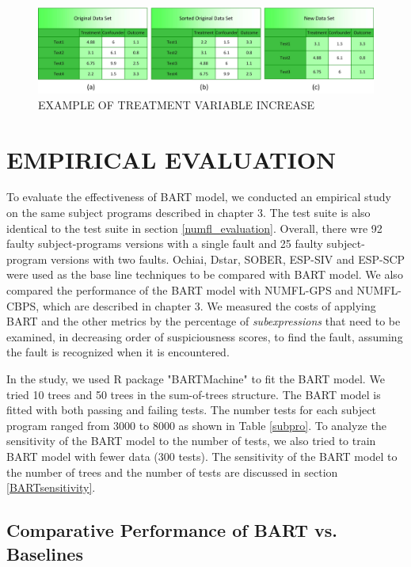 \begin{figure}[!thpb]
\centering
\includegraphics[width=1\textwidth]{chapter4_BART_ACE.pdf}
\caption{EXAMPLE OF TREATMENT VARIABLE INCREASE}
\label{bartace}
\end{figure}

\section{EMPIRICAL EVALUATION}\label{BARTevaluation}%

To evaluate the effectiveness of BART model, we conducted an empirical study on the same subject programs described in chapter 3.  The test suite is also identical to the test suite in section \ref{numfl_evaluation}.  Overall, there wre 92 faulty subject-programs versions with a single fault and 25 faulty subject-program versions with two faults. Ochiai, Dstar, SOBER, ESP-SIV and ESP-SCP were used as the base line techniques to be compared with BART model. We also compared the performance of the BART model with NUMFL-GPS and NUMFL-CBPS, which are described in chapter 3. We measured the costs of applying BART and the other metrics by the percentage of {\it subexpressions} that need to be examined, in decreasing order of suspiciousness scores, to find the fault, assuming the fault is recognized when it is encountered.

In the study, we used R package "BARTMachine" \cite{BARTMachine} to fit the BART model. We tried 10 trees and 50 trees in the sum-of-trees structure.  The BART model is fitted with both passing and failing tests. The number tests for each subject program ranged from 3000 to 8000 as shown in Table \ref{subpro}. To analyze the sensitivity of the BART model to the number of  tests, we also tried to train BART model with fewer data (300 tests). The sensitivity of the BART model to the number of trees and the number of tests are discussed in section \ref{BARTsensitivity}.

\subsection{Comparative Performance of BART vs. Baselines}

